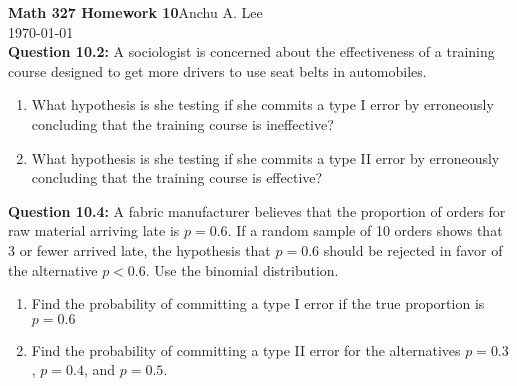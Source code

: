 \documentclass{article}
\begin{document}
\noindent\textbf{Math 327 Homework 10}\hfill Anchu A. Lee\\
\noindent\today\\\newline
\textbf{Question 10.2:}
A sociologist is concerned about the effectiveness 
of a training course designed to get more drivers
to use seat belts in automobiles.
\begin{enumerate}[label=(\alph*)]
    \item What hypothesis is she testing if she commits a
    type I error by erroneously concluding that the
    training course is ineffective?
    \item What hypothesis is she testing if she commits a
    type II error by erroneously concluding that the
    training course is effective?
\end{enumerate}

\textbf{Question 10.4:}
A fabric manufacturer believes that the proportion 
of orders for raw material arriving late is $p = 0.6$.
If a random sample of 10 orders shows that 3 or fewer
arrived late, the hypothesis that $p = 0.6$ should be
rejected in favor of the alternative $p < 0.6$. Use the
binomial distribution.
\begin{enumerate}[label=(\alph*)]
    \item Find the probability of committing a type I error
    if the true proportion is $p = 0.6$
    \item Find the probability of committing a type II error
    for the alternatives $p = 0.3$, $p = 0.4$, and $p = 0.5$.
\end{enumerate}
\end{document}
